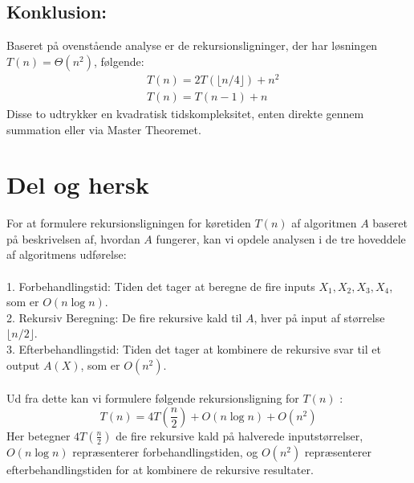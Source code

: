 \documentclass{article}
\begin{document}
\subsection{Konklusion:}
Baseret på ovenstående analyse er de rekursionsligninger, der har løsningen $T(n)=\Theta\left(n^2\right)$, følgende:
$$
\begin{aligned}
& T(n)=2 T(\lfloor n / 4\rfloor)+n^2 \\
& T(n)=T(n-1)+n
\end{aligned}
$$
Disse to udtrykker en kvadratisk tidskompleksitet, enten direkte gennem summation eller via Master Theoremet.

\section{Del og hersk}
For at formulere rekursionsligningen for køretiden $T(n)$ af algoritmen $A$ baseret på beskrivelsen af, hvordan $A$ fungerer, kan vi opdele analysen i de tre hoveddele af algoritmens udførelse:
\\
\\
1. Forbehandlingstid: Tiden det tager at beregne de fire inputs $X_1, X_2, X_3, X_4$, som er $O(n \log n)$.
\\
2. Rekursiv Beregning: De fire rekursive kald til $A$, hver på input af størrelse $\lfloor n / 2\rfloor$.
\\
3. Efterbehandlingstid: Tiden det tager at kombinere de rekursive svar til et output $A(X)$, som er $O\left(n^2\right)$.
\\
\\
Ud fra dette kan vi formulere følgende rekursionsligning for $T(n)$ :
$$
T(n)=4 T\left(\frac{n}{2}\right)+O(n \log n)+O\left(n^2\right)
$$
Her betegner $4 T\left(\frac{n}{2}\right)$ de fire rekursive kald på halverede inputstørrelser, $O(n \log n)$ repræsenterer forbehandlingstiden, og $O\left(n^2\right)$ repræsenterer efterbehandlingstiden for at kombinere de rekursive resultater.
\end{document}
